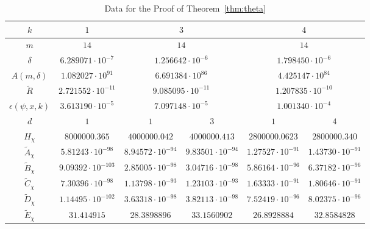 \documentclass{jT}
\theoremstyle{definition}
\begin{document}
\begin{table}[ht]
\begin{center}
\begin{tabular}{||c|c|c|c|c|c||} \hline 
$k$                    &      $1$                  & \multicolumn{2}{|c|}{$3$}                           & \multicolumn{2}{|c||}{$4$}                           \\ \hline
$m$                    & $14$                      & \multicolumn{2}{|c|}{$14$}                          & \multicolumn{2}{|c||}{$14$}                          \\ \hline
$\delta$               & $6.289071 \cdot 10^{-7}$  & \multicolumn{2}{|c|}{$1.256642 \cdot 10^{-6}$}      & \multicolumn{2}{|c||}{$1.798450 \cdot 10^{-6}$}      \\ \hline
$A(m, \delta)$         & $1.082027 \cdot 10^{91}$  & \multicolumn{2}{|c|}{$6.691384 \cdot 10^{86}$}      & \multicolumn{2}{|c||}{$4.425147 \cdot 10^{84}$}      \\ \hline
$\tilde{R}$            & $2.721552 \cdot 10^{-11}$ & \multicolumn{2}{|c|}{$9.085095 \cdot 10^{-11}$}     & \multicolumn{2}{|c||}{$1.207835 \cdot 10^{-10}$}     \\ \hline
$\epsilon(\psi, x, k)$ & $3.613190 \cdot 10^{-5}$  & \multicolumn{2}{|c|}{$7.097148 \cdot 10^{-5}$}      & \multicolumn{2}{|c||}{$1.001340 \cdot 10^{-4}$}      \\ \hline
$d$                    & $1$                       & $1$                      & $3$                      &  $1$                      & $4$                      \\ \hline
$H_{\chi}$             & $8000000.365$             & $4000000.042$            & $4000000.413$            & $2800000.0623$            & $2800000.340$            \\ \hline
$\tilde{A}_{\chi}$     & $5.81243 \cdot 10^{-98}$  & $8.94572 \cdot 10^{-94}$ & $9.83501 \cdot 10^{-94}$ & $1.27527 \cdot 10^{-91}$ &  $1.43730 \cdot 10^{-91}$ \\ \hline
$\tilde{B}_{\chi}$     & $9.09392 \cdot 10^{-103}$ & $2.85005 \cdot 10^{-98}$ & $3.04716 \cdot 10^{-98}$ & $5.86164 \cdot 10^{-96}$ &  $6.37182 \cdot 10^{-96}$ \\ \hline
$\tilde{C}_{\chi}$     & $7.30396 \cdot 10^{-98}$  & $1.13798 \cdot 10^{-93}$ & $1.23103 \cdot 10^{-93}$ & $1.63333 \cdot 10^{-91}$ &  $1.80646 \cdot 10^{-91}$ \\ \hline
$\tilde{D}_{\chi}$     & $1.14495 \cdot 10^{-102}$ & $3.63318 \cdot 10^{-98}$ & $3.82113 \cdot 10^{-98}$ & $7.52419 \cdot 10^{-96}$ &  $8.02375 \cdot 10^{-96}$ \\ \hline
$\tilde{E}_{\chi}$     & $31.414915$               & $28.3898896$              & $33.1560902$            & $ 26.8928884$             &  $32.8584828$            \\ \hline
\end{tabular}
\caption{Data for the Proof of Theorem~\ref{thm:theta}}
\end{center}
\end{table}
\end{document}
